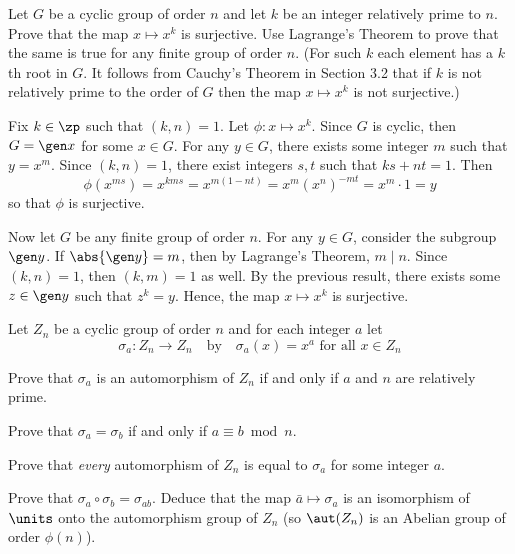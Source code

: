 \begin{exercise}\label{ex2.3.25}
    Let $G$ be a cyclic group of order $n$ and let $k$ be an integer relatively prime to $n$. Prove that the map $x \mapsto x^k$ is surjective. Use Lagrange's Theorem to prove that the same is true for any finite group of order $n$. (For such $k$ each element has a $k$th root in $G$. It follows from Cauchy's Theorem in Section 3.2 that if $k$ is not relatively prime to the order of $G$ then the map $x \mapsto x^k$ is not surjective.)
\end{exercise}

\begin{sol}
    Fix $k \in \zp$ such that $(k, n) = 1$. Let $\phi : x \mapsto x^k$. Since $G$ is cyclic, then $G = \gen x$ for some $x \in G$. For any $y \in G$, there exists some integer $m$ such that $y = x^m$. Since $(k, n) = 1$, there exist integers $s, t$ such that $ks + nt = 1$. Then
    \[\phi(x^{ms}) = x^{kms} = x^{m(1 - nt)} = x^m (x^n)^{-mt} = x^m \cdot 1 = y\]
    so that $\phi$ is surjective.

    Now let $G$ be any finite group of order $n$. For any $y \in G$, consider the subgroup $\gen y$. If $\abs{\gen y} = m$, then by Lagrange's Theorem, $m \mid n$. Since $(k, n) = 1$, then $(k, m) = 1$ as well. By the previous result, there exists some $z \in \gen y$ such that $z^k = y$. Hence, the map $x \mapsto x^k$ is surjective.
\end{sol}

\begin{specialexercise}\label{ex2.3.26}
    Let $Z_n$ be a cyclic group of order $n$ and for each integer $a$ let
    \[\sigma_a : Z_n \to Z_n \quad \text{by} \quad \sigma_a(x) = x^a \text{ for all } x \in Z_n\]
    \begin{subproblems}
        \item Prove that $\sigma_a$ is an automorphism of $Z_n$ if and only if $a$ and $n$ are relatively prime.
        \item Prove that $\sigma_a = \sigma_b$ if and only if $a \equiv b \bmod n$.
        \item Prove that \emph{every} automorphism of $Z_n$ is equal to $\sigma_a$ for some integer $a$.
        \item Prove that $\sigma_a \circ \sigma_b = \sigma_{ab}$. Deduce that the map $\bar a \mapsto \sigma_a$ is an isomorphism of $\units$ onto the automorphism group of $Z_n$ (so $\aut(Z_n)$ is an Abelian group of order $\phi(n)$).
    \end{subproblems}
\end{specialexercise}


